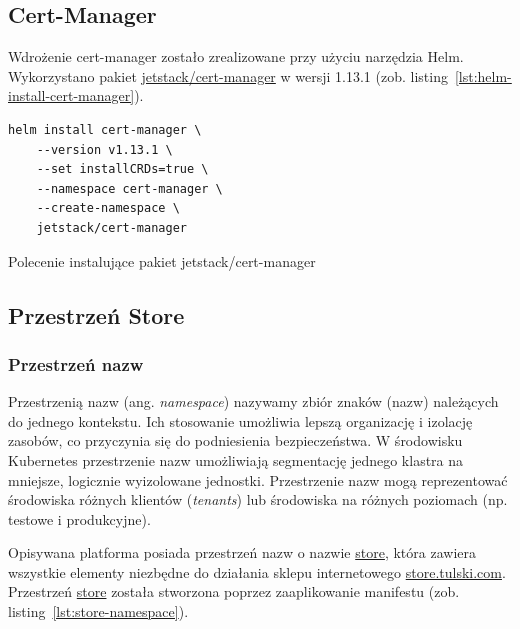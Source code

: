 \subsection{Cert-Manager}\label{subsec:cert-manager-impl}

Wdrożenie cert-manager zostało zrealizowane przy użyciu narzędzia Helm.
Wykorzystano pakiet \url{jetstack/cert-manager} w wersji 1.13.1 (zob. listing~\ref{lst:helm-install-cert-manager}).

\begin{listing}[H]
    \begin{verbatim}
helm install cert-manager \
    --version v1.13.1 \
    --set installCRDs=true \
    --namespace cert-manager \
    --create-namespace \
    jetstack/cert-manager
    \end{verbatim}
    \caption{Polecenie instalujące pakiet jetstack/cert-manager}
    \label{lst:helm-install-cert-manager}
\end{listing}

%

\subsection{Przestrzeń Store}\label{subsec:store}

\subsubsection{Przestrzeń nazw}

Przestrzenią nazw (ang. \emph{namespace}) nazywamy zbiór znaków (nazw) należących do jednego kontekstu.
Ich stosowanie umożliwia lepszą organizację i izolację zasobów, co przyczynia się do podniesienia bezpieczeństwa.
W środowisku Kubernetes przestrzenie nazw umożliwiają segmentację jednego klastra na mniejsze, logicznie wyizolowane jednostki.
Przestrzenie nazw mogą reprezentować środowiska różnych klientów (\emph{tenants}) lub środowiska na różnych poziomach (np. testowe i produkcyjne).

Opisywana platforma posiada przestrzeń nazw o nazwie \url{store}, która zawiera wszystkie elementy niezbędne do działania sklepu internetowego \url{store.tulski.com}.
Przestrzeń \url{store} została stworzona poprzez zaaplikowanie manifestu (zob. listing~\ref{lst:store-namespace}).

